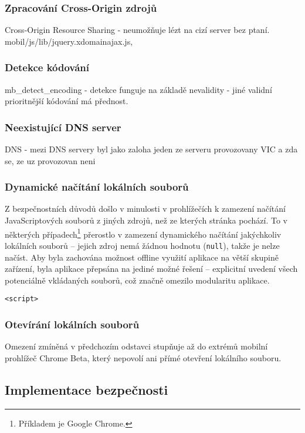 \subsubsection{Zpracování Cross-Origin zdrojů}
\label{sec:mobil:cross-origin}
Cross-Origin Resource Sharing - neumožňuje lézt na cizí server bez ptaní.
mobil/js/lib/jquery.xdomainajax.js, 

\subsubsection{Detekce kódování}
mb\_detect\_encoding - detekce funguje na základě nevalidity - jiné validní prioritnější kódování má přednost.

\subsubsection{Neexistující DNS server}
DNS - mezi DNS servery byl jako zaloha jeden ze serveru provozovany VIC a zda se, ze uz provozovan neni

\subsubsection{Dynamické načítání lokálních souborů}
Z bezpečnostních důvodů došlo v minulosti v prohlížečích k zamezení načítání JavaScriptových souborů z jiných zdrojů, než ze kterých stránka pochází. To v některých případech\footnote{Příkladem je Google Chrome.} přerostlo v zamezení dynamického načítání jakýchkoliv lokálních souborů -- jejich zdroj nemá žádnou hodnotu (\texttt{null}), takže je nelze načíst. Aby byla zachována možnost offline využití aplikace na větší skupině zařízení, byla aplikace přepsána na jediné možné řešení -- explicitní uvedení všech potenciálně vkládaných souborů, což značně omezilo modularitu aplikace.

\verb|<script>|


\subsubsection{Otevírání lokálních souborů}
Omezení zmíněná v předchozím odstavci stupňuje až do extrémů mobilní prohlížeč Chrome Beta, který nepovolí ani přímé otevření lokálního souboru. 

\subsection{Implementace bezpečnosti}



